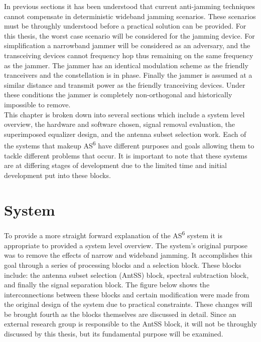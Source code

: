 In previous sections it has been understood that current anti-jamming techniques cannot compensate in deterministic wideband jamming scenarios.  These scenarios must be throughly understood before a practical solution can be provided.  For this thesis, the worst case scenario will be considered for the jamming device.  For simplification a narrowband jammer will be considered as an adversary, and the transceiving devices cannot frequency hop thus remaining on the same frequency as the jammer.  The jammer has an identical modulation scheme as the friendly tranceivers and the constellation is in phase.  Finally the jammer is assumed at a similar distance and transmit power as the friendly tranceiving devices.  Under these conditions the jammer is completely non-orthogonal and historically impossible to remove.\\

This chapter is broken down into several sections which include a system level overview, the hardware and software chosen, signal removal evaluation, the superimposed equalizer design, and the antenna subset selection work.  Each of the systems that makeup AS\textsuperscript{6} have different purposes and goals allowing them to tackle different problems that occur.  It is important to note that these systems are at differing stages of development due to the limited time and initial development put into these blocks.\\ 

\section{System}

To provide a more straight forward explanation of the AS\textsuperscript{6} system it is appropriate to provided a system level overview.  The system's original purpose was to remove the effects of narrow and wideband jamming.  It accomplishes this goal through a series of processing blocks and a selection block.  These blocks include: the antenna subset selection (AntSS) block, spectral subtraction block, and finally the signal separation block.  The figure below shows the interconnections between these blocks and certain modification were made from the original design of the system due to practical constraints.  These changes will be brought fourth as the blocks themselves are discussed in detail. Since an external research group is responsible to the AntSS block, it will not be throughly discussed by this thesis, but its fundamental purpose will be examined.\\

